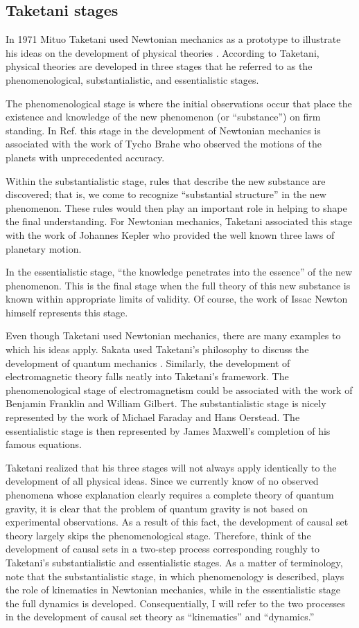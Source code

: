 \documentclass[aps,amssymb,12pt]{revtex4-2}
\begin{document}
\subsection{Taketani stages}

In 1971 Mituo Taketani used Newtonian mechanics as a prototype to illustrate
his ideas on the development of physical theories \cite{21}. According to
Taketani, physical theories are developed in three stages that he referred
to as the phenomenological, substantialistic, and essentialistic stages.

The phenomenological stage is where the initial observations occur that
place the existence and knowledge of the new phenomenon (or ``substance'')
on firm standing. In Ref. \cite{21} this stage in the development of Newtonian
mechanics is associated with the work of Tycho Brahe who observed the
motions of the planets with unprecedented accuracy.

Within the substantialistic stage, rules that describe the new substance are
discovered; that is, we come to recognize ``substantial structure'' in the
new phenomenon. These rules would then play an important role in helping to
shape the final understanding. For Newtonian mechanics, Taketani associated
this stage with the work of Johannes Kepler who provided the well known
three laws of planetary motion.

In the essentialistic stage, ``the knowledge penetrates into the essence''
of the new phenomenon. This is the final stage when the full theory of this
new substance is known within appropriate limits of validity. Of course, the
work of Issac Newton himself represents this stage.

Even though Taketani used Newtonian mechanics, there are many examples to
which his ideas apply. Sakata used Taketani's philosophy to discuss the
development of quantum mechanics \cite{22}. Similarly, the development of
electromagnetic theory falls neatly into Taketani's framework. The
phenomenological stage of electromagnetism could be associated with the work
of Benjamin Franklin and William Gilbert. The substantialistic stage is
nicely represented by the work of Michael Faraday and Hans Oerstead. The
essentialistic stage is then represented by James Maxwell's completion of
his famous equations.

Taketani realized that his three stages will not always apply identically to
the development of all physical ideas. Since we currently know of no
observed phenomena whose explanation clearly requires a complete theory of
quantum gravity, it is clear that the problem of quantum gravity is not
based on experimental observations. As a result of this fact, the
development of causal set theory largely skips the phenomenological stage.
Therefore, think of the development of causal sets in a two-step process
corresponding roughly to Taketani's substantialistic and essentialistic
stages. As a matter of terminology, note that the substantialistic stage, in
which phenomenology is described, plays the role of kinematics in Newtonian
mechanics, while in the essentialistic stage the full dynamics is developed.
Consequentially, I will refer to the two processes in the development of
causal set theory as ``kinematics'' and ``dynamics.''
\end{document}
